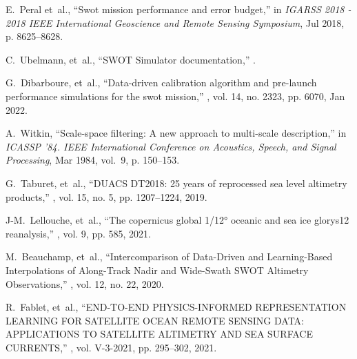 \begin{bibunit}

% 
% 
\begin{thebibliography}{10}

E.~Peral et~al.,
\newblock ``Swot mission performance and error budget,''
\newblock in {\em IGARSS 2018 - 2018 IEEE International Geoscience and Remote
  Sensing Symposium}, Jul 2018, p. 8625–8628.

C.~Ubelmann, et~al.,
\newblock ``{SWOT} {Simulator} documentation,'' .

G.~Dibarboure, et~al.,
\newblock ``Data-driven calibration algorithm and pre-launch performance
  simulations for the swot mission,''
, vol. 14, no. 2323, pp. 6070, Jan 2022.

A.~Witkin,
\newblock ``Scale-space filtering: A new approach to multi-scale description,''
\newblock in {\em ICASSP ’84. IEEE International Conference on Acoustics,
  Speech, and Signal Processing}, Mar 1984, vol.~9, p. 150–153.

G.~Taburet, et~al.,
\newblock ``{DUACS} {DT2018}: 25 years of reprocessed sea level altimetry
  products,''
, vol. 15, no. 5, pp. 1207--1224, 2019.

J-M.~Lellouche, et~al.,
\newblock ``The copernicus global 1/12° oceanic and sea ice glorys12
  reanalysis,''
, vol. 9, pp. 585, 2021.

M.~Beauchamp, et~al.,
\newblock ``Intercomparison of {Data}-{Driven} and {Learning}-{Based}
  {Interpolations} of {Along}-{Track} {Nadir} and {Wide}-{Swath} {SWOT}
  {Altimetry} {Observations},''
, vol. 12, no. 22, 2020.

R.~Fablet, et~al.,
\newblock ``{END}-{TO}-{END} {PHYSICS}-{INFORMED} {REPRESENTATION} {LEARNING}
  {FOR} {SATELLITE} {OCEAN} {REMOTE} {SENSING} {DATA}: {APPLICATIONS} {TO}
  {SATELLITE} {ALTIMETRY} {AND} {SEA} {SURFACE} {CURRENTS},''
, vol. V-3-2021, pp. 295--302, 2021.


\end{thebibliography}
\end{bibunit}
